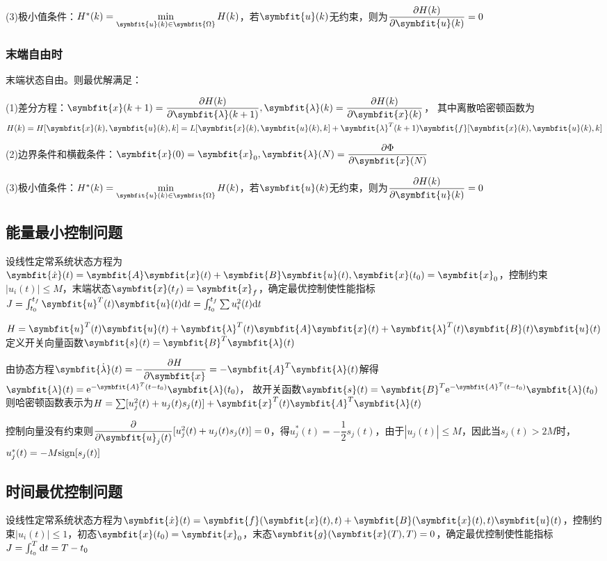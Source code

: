 \documentclass[11pt,a4paper]{ctexart}
\renewcommand{\d}{{\rm d}}
\newcommand{\e}{{\rm e}}
\newcommand{\bm}{\symbfit}
\begin{document}
            (3)极小值条件：$H^*(k)=\min\limits_{\bm{u}(k)\in\bm{\Omega}}H(k)$，若$\bm{u}(k)$无约束，则为$\dfrac{\partial H(k)}{\partial\bm{u}(k)}=0$
        \subsubsection{末端自由时}
            末端状态自由。则最优解满足：
            
            (1)差分方程：$\bm{x}(k+1)=\dfrac{\partial H(k)}{\partial\bm{\lambda}(k+1)},\bm{\lambda}(k)=\dfrac{\partial H(k)}{\partial\bm{x}(k)}$，
            其中离散哈密顿函数为$H(k)=H[\bm{x}(k),\bm{u}(k),k]=L[\bm{x}(k),\bm{u}(k),k]+\bm{\lambda}^T(k+1)\bm{f}[\bm{x}(k),\bm{u}(k),k]$
            
            (2)边界条件和横截条件：$\bm{x}(0)=\bm{x}_0,\bm{\lambda}(N)=\dfrac{\partial\Phi}{\partial\bm{x}(N)}$
            
            (3)极小值条件：$H^*(k)=\min\limits_{\bm{u}(k)\in\bm{\Omega}}H(k)$，若$\bm{u}(k)$无约束，则为$\dfrac{\partial H(k)}{\partial\bm{u}(k)}=0$
    \subsection{能量最小控制问题}
        设线性定常系统状态方程为$\bm{\dot x}(t)=\bm{A}\bm{x}(t)+\bm{B}\bm{u}(t),\bm{x}(t_0)=\bm{x}_0$，控制约束$|u_i(t)|\leqslant M$，末端状态$\bm{x}(t_f)=\bm{x}_f$，确定最优控制使性能指标
        $J=\int_{t_0}^{t_f}\bm{u}^T(t)\bm{u}(t)\d t=\int_{t_0}^{t_f}\sum u_i^2(t)\d t$

        $H=\bm{u}^T(t)\bm{u}(t)+\bm{\lambda}^T(t)\bm{A}\bm{x}(t)+\bm{\lambda}^T(t)\bm{B}(t)\bm{u}(t)$
        定义开关向量函数$\bm{s}(t)=\bm{B}^T\bm{\lambda}(t)$

        由协态方程$\bm{\dot\lambda}(t)=-\dfrac{\partial H}{\partial\bm{x}}=-\bm{A}^T\bm{\lambda}(t)$解得$\bm{\lambda}(t)=\e^{-\bm{A}^T(t-t_0)}\bm{\lambda}(t_0)$，
        故开关函数$\bm{s}(t)=\bm{B}^T\e^{-\bm{A}^T(t-t_0)}\bm{\lambda}(t_0)$
        则哈密顿函数表示为$H=\sum[u_j^2(t)+u_j(t)s_j(t)]+\bm{x}^T(t)\bm{A}^T\bm{\lambda}(t)$

        控制向量没有约束则$\dfrac{\partial}{\partial\bm{u}_j(t)}[u_j^2(t)+u_j(t)s_j(t)]=0$，得$u_j^*(t)=-\dfrac{1}{2}s_j(t)$，由于$|u_j(t)|\leqslant M$，因此当$s_j(t)>2M$时，$u^*_j(t)=-M{\rm sign}[s_j(t)]$
    \subsection{时间最优控制问题}
        设线性定常系统状态方程为$\bm{\dot x}(t)=\bm{f}(\bm{x}(t),t)+\bm{B}(\bm{x}(t),t)\bm{u}(t)$，控制约束$|u_i(t)|\leqslant 1$，初态$\bm{x}(t_0)=\bm{x}_0$，末态$\bm{g}(\bm{x}(T),T)=0$，确定最优控制使性能指标
        $J=\int_{t_0}^{T}\d t=T-t_0$
\end{document}
